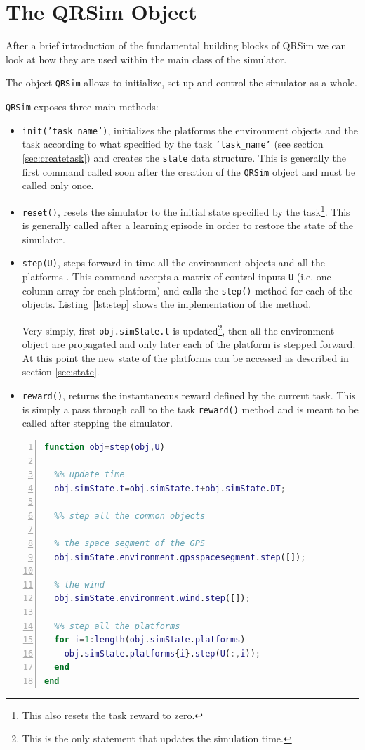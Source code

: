 \documentclass[a4paper,11pt]{report}
\newcommand{\sname}{QRSim\xspace}
\newcommand{\snamettt}{\texttt{QRSim}\xspace}
\begin{document}
\section{The \sname Object}\label{sec:qrobj}

After a brief introduction of the fundamental building blocks of \sname we can look at how they are used within the main class of the simulator. 

The object \snamettt allows to initialize, set up and control the simulator as a whole. 

\snamettt exposes three main methods:
\begin{itemize}
 \item \texttt{init('task\_name')}, initializes the platforms the environment objects and the task according to what specified by the task \texttt{'task\_name'} (see section \ref{sec:createtask}) and creates the \texttt{state} data structure. This is generally the first command called soon after the creation of the \snamettt object and must be called only once.
 \item \texttt{reset()}, resets the simulator to the initial state specified by the task\footnote{This also resets the task reward to zero.}. This is generally called after a learning episode in order to restore the state of the simulator. 
 \item \texttt{step(U)}, steps forward in time all the environment objects and all the platforms . This command accepts a matrix of control inputs \texttt{U} (i.e. one column array for each platform) and calls the \texttt{step()} method for each of the objects. Listing~\ref{lst:step} shows the implementation of the method.

Very simply, first \texttt{obj.simState.t} is updated\footnote{This is the only statement that updates the simulation time.}, then all the environment object are propagated and only later each of the platform is stepped forward. At this point the new state of the platforms can be accessed as described in section \ref{sec:state}.
 \item \texttt{reward()}, returns the instantaneous reward defined by the current task. This is simply a pass through call to the task \texttt{reward()} method and is meant to be called after stepping the simulator.
\end{itemize}

\begin{lstlisting}[float=ht!bp,caption=\sname step() method,language=Matlab,frame=lines,label=lst:step,numbers=left,basicstyle=\small]
function obj=step(obj,U)
           
  %% update time
  obj.simState.t=obj.simState.t+obj.simState.DT;
                        
  %% step all the common objects
            
  % the space segment of the GPS
  obj.simState.environment.gpsspacesegment.step([]);
            
  % the wind
  obj.simState.environment.wind.step([]);
            
  %% step all the platforms            
  for i=1:length(obj.simState.platforms)
    obj.simState.platforms{i}.step(U(:,i));
  end
end
\end{lstlisting}
\end{document}
